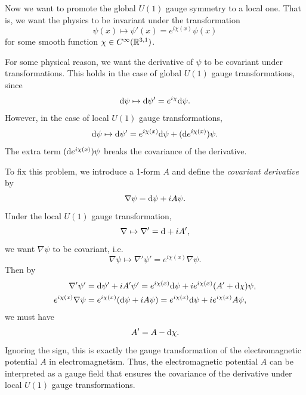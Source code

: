 Now we want to promote the global $U(1)$ gauge symmetry to a local one.
That is, we want the physics to be invariant under the transformation
\begin{equation*}
    \psi(x) \mapsto \psi'(x)=e^{i\chi(x)}\psi(x)
\end{equation*}
for some smooth function $\chi\in C^\infty(\mathbb{R}^{3,1})$.

For some physical reason, we want the derivative of $\psi$ to be covariant under transformations. 
This holds in the case of global $U(1)$ gauge transformations, since 
\begin{equation*}
    {\rm d}\psi \mapsto {\rm d}\psi' = e^{i\chi}{\rm d}\psi.
\end{equation*}
However, in the case of local $U(1)$ gauge transformations,
\begin{equation*}
    {\rm d}\psi \mapsto {\rm d}\psi' = e^{i\chi(x)}{\rm d}\psi + ({\rm d} e^{i\chi(x)})\psi.
\end{equation*}
The extra term $({\rm d} e^{i\chi(x)})\psi$ breaks the covariance of the derivative.

To fix this problem, we introduce a 1-form $A$ and define the \textit{covariant derivative} by 
\begin{equation*}
    \nabla\psi = {\rm d}\psi + iA\psi.
\end{equation*}
Under the local $U(1)$ gauge transformation, 
\begin{equation*}
    \nabla\mapsto \nabla'={\rm d} + iA',
\end{equation*}
we want $\nabla\psi$ to be covariant, i.e. 
\begin{equation*}
    \nabla\psi\mapsto\nabla'\psi' = e^{i\chi(x)}\nabla\psi.
\end{equation*}
Then by 
\begin{align*}
    \nabla'\psi' &= {\rm d}\psi' + iA'\psi' = e^{i\chi(x)}{\rm d}\psi + ie^{i\chi(x)}(A'+{\rm d}\chi)\psi, \\
    e^{i\chi(x)}\nabla\psi &= e^{i\chi(x)}({\rm d}\psi + iA\psi) = e^{i\chi(x)}{\rm d}\psi + ie^{i\chi(x)}A\psi,
\end{align*}
we must have 
\begin{equation*}
    A' = A - {\rm d}\chi.
\end{equation*}
Ignoring the sign, this is exactly the gauge transformation of the electromagnetic potential $A$ in electromagnetism.
Thus, the electromagnetic potential $A$ can be interpreted as a gauge field 
that ensures the covariance of the derivative under local $U(1)$ gauge transformations.